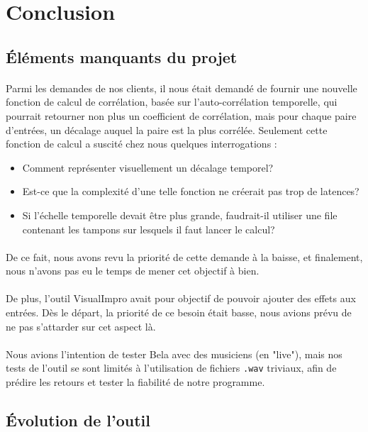 \newpage
\section{Conclusion}
\subsection{Éléments manquants du projet}
\paragraph{}
Parmi les demandes de nos clients, il nous était demandé de fournir une nouvelle fonction de calcul de corrélation, basée sur l'auto-corrélation temporelle, qui pourrait retourner non plus un coefficient de corrélation, mais pour chaque paire d'entrées, un décalage auquel la paire est la plus corrélée. Seulement cette fonction de calcul a suscité chez nous quelques interrogations :
\begin{itemize}
    \item Comment représenter visuellement un décalage temporel?
    \item Est-ce que la complexité d'une telle fonction ne créerait pas trop de latences?
    \item Si l'échelle temporelle devait être plus grande, faudrait-il utiliser une file contenant les tampons sur lesquels il faut lancer le calcul?
\end{itemize}
\paragraph{}
De ce fait, nous avons revu la priorité de cette demande à la baisse, et finalement, nous n'avons pas eu le temps de mener cet objectif à bien.
\paragraph{}
De plus, l'outil VisualImpro avait pour objectif de pouvoir ajouter des effets aux entrées. Dès le départ, la priorité de ce besoin était basse, nous avions prévu de ne pas s'attarder sur cet aspect là.
\paragraph{}
Nous avions l'intention de tester Bela avec des musiciens (en "live"), mais nos tests de l'outil se sont limités à l'utilisation de fichiers \verb!.wav! triviaux, afin de prédire les retours et tester la fiabilité de notre programme.
\subsection{Évolution de l'outil}
